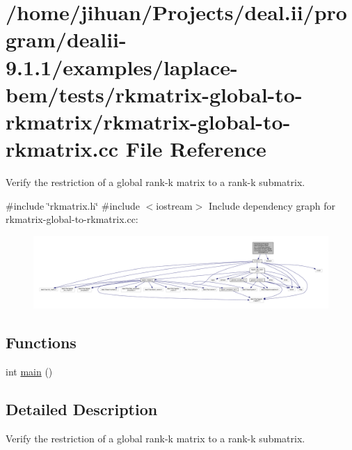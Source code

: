 \hypertarget{rkmatrix-global-to-rkmatrix_8cc}{}\section{/home/jihuan/\+Projects/deal.ii/program/dealii-\/9.1.1/examples/laplace-\/bem/tests/rkmatrix-\/global-\/to-\/rkmatrix/rkmatrix-\/global-\/to-\/rkmatrix.cc File Reference}
\label{rkmatrix-global-to-rkmatrix_8cc}


Verify the restriction of a global rank-\/k matrix to a rank-\/k submatrix.  


{\ttfamily \#include \char`\"{}rkmatrix.\+h\char`\"{}}\newline
{\ttfamily \#include $<$iostream$>$}\newline
Include dependency graph for rkmatrix-\/global-\/to-\/rkmatrix.cc\+:\nopagebreak
\begin{figure}[H]
\begin{center}
\leavevmode
\includegraphics[width=350pt]{rkmatrix-global-to-rkmatrix_8cc__incl}
\end{center}
\end{figure}
\subsection*{Functions}
\begin{DoxyCompactItemize}
\item 
int \hyperlink{rkmatrix-global-to-rkmatrix_8cc_ae66f6b31b5ad750f1fe042a706a4e3d4}{main} ()
\end{DoxyCompactItemize}


\subsection{Detailed Description}
Verify the restriction of a global rank-\/k matrix to a rank-\/k submatrix. 


